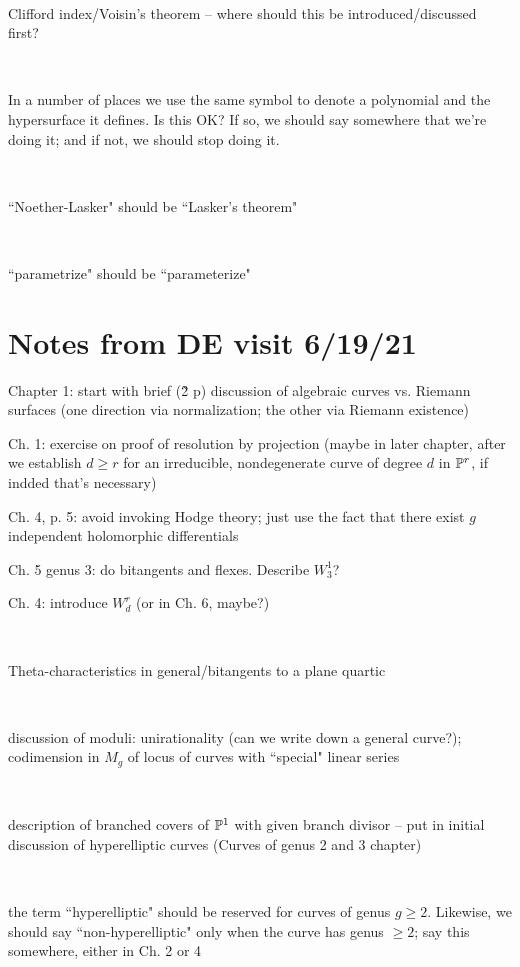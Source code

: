 \documentclass[12pt, leqno]{book}
\begin{document}
\

Clifford index/Voisin's theorem -- where should this be introduced/discussed first?

\

In a number of places we use the same symbol to denote a polynomial and the hypersurface it defines. Is this OK? If so, we should say somewhere that we're doing it; and if not, we should stop doing it.

\

``Noether-Lasker" should be ``Lasker's theorem"

\

``parametrize" should be ``parameterize"

\section{Notes from DE visit 6/19/21}

Chapter 1: start with brief (\~2 p) discussion of algebraic curves vs. Riemann surfaces (one direction via normalization; the other via Riemann existence)

Ch. 1: exercise on proof of resolution by projection (maybe in later chapter, after we establish $d \geq r$ for an irreducible, nondegenerate  curve of degree $d$ in $\PP^r$, if indded that's necessary)

Ch. 4, p. 5: avoid invoking Hodge theory; just use the fact that there exist $g$ independent holomorphic differentials


Ch. 5 genus 3: do bitangents and flexes. Describe $W^1_3$?

Ch. 4: introduce $W^r_d$ (or in Ch. 6, maybe?)

\

Theta-characteristics in general/bitangents to a plane quartic

\

discussion of moduli: unirationality (can we write down a general curve?); codimension in $M_g$ of locus of curves with ``special" linear series

\

description of branched covers of $\PP^1$ with given branch divisor -- put in initial discussion of hyperelliptic curves (Curves of genus 2 and 3 chapter)

\

the term ``hyperelliptic" should be reserved for curves of genus $g \geq 2$. Likewise, we should say ``non-hyperelliptic" only when the curve has genus $\geq 2$; say this somewhere, either in Ch. 2 or 4
\end{document}
